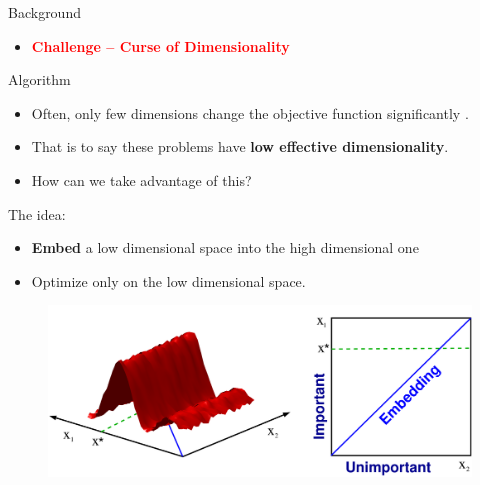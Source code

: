 \documentclass[final]{beamer}
\begin{document}
\begin{frame}[t]
\begin{columns}[T]
\begin{column}{.48\textwidth}
\begin{block}{Background}
\begin{minipage}[r]{0.35\columnwidth}
\begin{figure}[t]
     \end{figure}
    \end{minipage}
  
 \begin{itemize}
    \item {\bf \textcolor{red}{ Challenge -- Curse of Dimensionality}}
   \end{itemize}
\end{block}

\begin{block}{Algorithm}

     \begin{itemize}
      \item Often, only few dimensions change the objective function significantly
       \textcolor{gray}{\cite{Bergstra:2012, Hutter:2013_KeyParameters}}.
      \item That is to say these problems have 
       {\bf \textcolor{myColor}{low effective dimensionality}}.
       \item How can we take advantage of this?
     \end{itemize}

    
    The idea:
   \begin{itemize}
    \item {\bf \textcolor{myColor}{Embed}} 
     a low dimensional space into the high dimensional one
    \item Optimize
     only on the low dimensional space.
   \end{itemize}

  \begin{figure}[t]
   \includegraphics[width = 0.9\columnwidth]
   {../paper/figures/2to1embedding}
   \label{fig:ESSL_BLR}
  \end{figure}
  

\end{block}
\end{column}
\end{columns}
\end{frame}
\end{document}
